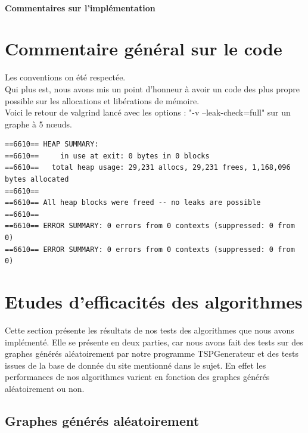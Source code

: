 \documentclass[10pt,a4paper]{report}
\begin{document}
		\paragraph{Commentaires sur l'implémentation\\}

\newpage		
\section{Commentaire général sur le code}

\begin{flushleft}
Les conventions on été respectée. \\
Qui plus est, nous avons mis un point d'honneur à avoir un code des plus propre possible sur les allocations et libérations de mémoire. \\

Voici le retour de valgrind lancé avec les options : "-v --leak-check=full" sur un graphe à 5 nœuds. \\
\end{flushleft}
\begin{verbatim}
==6610== HEAP SUMMARY:
==6610==     in use at exit: 0 bytes in 0 blocks
==6610==   total heap usage: 29,231 allocs, 29,231 frees, 1,168,096 bytes allocated
==6610== 
==6610== All heap blocks were freed -- no leaks are possible
==6610== 
==6610== ERROR SUMMARY: 0 errors from 0 contexts (suppressed: 0 from 0)
==6610== ERROR SUMMARY: 0 errors from 0 contexts (suppressed: 0 from 0)
\end{verbatim}



\newpage
\section{Etudes d'efficacités des algorithmes}
	\begin{flushleft}
	Cette section présente les résultats de nos tests des algorithmes que nous avons implémenté. Elle se présente en deux parties, car nous avons fait des tests sur des graphes générés aléatoirement par notre programme TSPGenerateur et des tests issues de la base de donnée du site mentionné dans le sujet. En effet les performances de nos algorithmes varient en fonction des graphes générés aléatoirement ou non.
	\end{flushleft}
	\subsection{Graphes générés aléatoirement}
\end{document}
